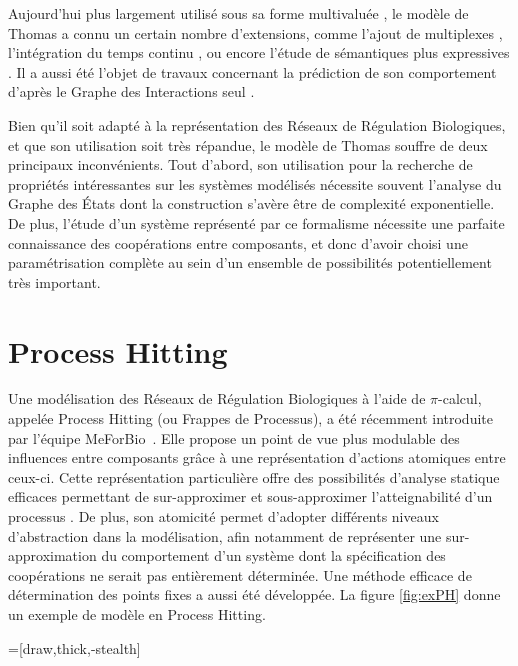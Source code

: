 Aujourd'hui plus largement utilisé sous sa forme multivaluée \cite{richard-comet-bernot-08}, le modèle de Thomas a connu un certain nombre d'extensions,
comme l'ajout de multiplexes \cite{bernot-comet-khalis-08},
l'intégration du temps continu \cite{Ahmad08},
ou encore l'étude de sémantiques plus expressives \cite{BernotSemBRN}.
Il a aussi été l'objet de travaux concernant la prédiction de son comportement d'après le Graphe des Interactions seul \cite{RiCo07}.

Bien qu'il soit adapté à la représentation des Réseaux de Régulation Biologiques, et que son utilisation soit très répandue, le modèle de Thomas souffre de deux principaux inconvénients.
Tout d'abord, son utilisation pour la recherche de propriétés intéressantes sur les systèmes modélisés nécessite souvent l'analyse du Graphe des États dont la construction s'avère être de complexité exponentielle.
De plus, l'étude d'un système représenté par ce formalisme nécessite une parfaite connaissance des coopérations entre composants, et donc d'avoir choisi une paramétrisation complète au sein d'un ensemble de possibilités potentiellement très important.




\section{Process Hitting}\label{sec:PH}
Une modélisation des Réseaux de Régulation Biologiques à l'aide de $\pi$-calcul, appelée Process Hitting (ou Frappes de Processus), a été récemment introduite par l'équipe MeForBio~\cite{PMR10-TCSB,PaulevePhD}.
Elle propose un point de vue plus modulable des influences entre composants grâce à une représentation d'actions atomiques entre ceux-ci.
Cette représentation particulière offre des possibilités d'analyse statique efficaces permettant de sur-approximer et sous-approximer l'atteignabilité d'un processus \cite{PMR12-MSCS}.
De plus, son atomicité permet d'adopter différents niveaux d'abstraction dans la modélisation, afin notamment de représenter une sur-approximation du comportement d'un système dont la spécification des coopérations ne serait pas entièrement déterminée.
Une méthode efficace de détermination des points fixes a aussi été développée.
La figure \ref{fig:exPH} donne un exemple de modèle en Process Hitting.

=[draw,thick,-stealth]

